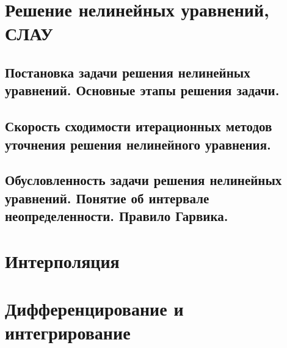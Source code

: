 \documentclass[14pt]{extarticle}
\begin{document}
\section{Решение нелинейных уравнений, СЛАУ}

\subsection{Постановка задачи решения нелинейных уравнений. Основные этапы решения задачи.}

\subsection{Скорость сходимости итерационных методов уточнения решения нелинейного уравнения.}

\subsection{Обусловленность задачи решения нелинейных уравнений. Понятие об интервале неопределенности. Правило Гарвика.}

\section{Интерполяция}


\section{Дифференцирование и интегрирование}
\end{document}
